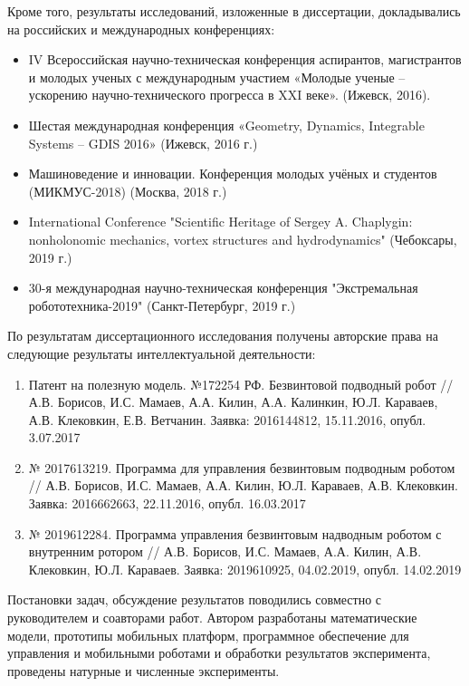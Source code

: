 Кроме того, результаты исследований, изложенные в диссертации, докладывались на российских и международных конференциях:
\begin{itemize}
	\item IV Всероссийская научно-техническая конференция аспирантов, магистрантов и молодых ученых с международным участием «Молодые ученые -- ускорению научно-технического прогресса в XXI веке». (Ижевск, 2016).
	\item Шестая международная конференция «Geometry, Dynamics, Integrable Systems -- GDIS 2016» (Ижевск, 2016 г.)
	\item Машиноведение и инновации. Конференция молодых учёных и студентов (МИКМУС-2018) (Москва, 2018 г.)
	\item International Conference "Scientific Heritage of Sergey A. Chaplygin: nonholonomic mechanics, vortex structures and hydrodynamics" (Чебоксары, 2019 г.)
	\item 30-я международная научно-техническая конференция "Экстремальная робототехника-2019" (Санкт-Петербург, 2019 г.)	
\end{itemize}

По результатам диссертационного исследования получены авторские права на следующие результаты интеллектуальной деятельности:
\begin{enumerate}
	
	\item Патент на полезную модель. №172254 РФ. Безвинтовой подводный робот //  А.В. Борисов, И.С. Мамаев, А.А. Килин, А.А. Калинкин, Ю.Л. Караваев, А.В. Клековкин, Е.В. Ветчанин. Заявка: 2016144812, 15.11.2016, опубл. 3.07.2017
	
	\item № 2017613219. Программа для управления безвинтовым подводным роботом // А.В. Борисов, И.С. Мамаев, А.А. Килин, Ю.Л. Караваев, А.В. Клековкин. Заявка: 2016662663, 22.11.2016, опубл. 16.03.2017
	
	\item № 2019612284. Программа управления безвинтовым надводным роботом с внутренним ротором // А.В. Борисов, И.С. Мамаев, А.А. Килин, А.В. Клековкин, Ю.Л. Караваев. Заявка: 2019610925, 04.02.2019, опубл. 14.02.2019
	
\end{enumerate}

{\contribution} Постановки задач, обсуждение результатов поводились совместно с руководителем и соавторами работ. Автором разработаны математические модели, прототипы мобильных платформ, программное обеспечение для управления и мобильными роботами и обработки результатов эксперимента, проведены натурные и численные эксперименты.

